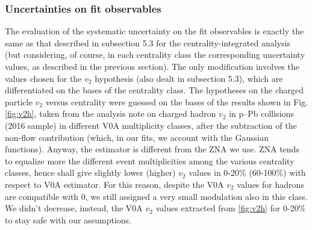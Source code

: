 \subsubsection{Uncertainties on fit observables}
The evaluation of the systematic uncertainty on the fit observables is exactly the same as that described in subsection 5.3 for the centrality-integrated analysis (but considering, of course, in each centrality class the corresponding uncertainty values, as described in the previous section).
The only modification involves the values chosen for the $v_2$ hypothesis (also dealt in subsection 5.3), which are differentiated on the bases of the centrality class.
The hypotheses on the charged particle $v_2$ versus centrality were guessed on the bases of the results shown in Fig. \ref{fig:v2h}, taken from the analysis note on charged hadron $v_2$ in p--Pb collisions (2016 sample) in different V0A multiplicity classes, after the subtraction of the non-flow contribution (which, in our fits, we account with the Gaussian functions). Anyway, the estimator is different from the ZNA we use. ZNA tends to equalize more the different event multiplicities among the various centrality classes, hence shall give slightly lower (higher) $v_2$ values in 0-20\% (60-100\%) with respect to V0A estimator. For this reason, despite the V0A $v_2$ values for hadrons are compatible with 0, we still assigned a very small modulation also in this class. We didn't decrease, instead, the V0A $v_2$ values extracted from \ref{fig:v2h} for 0-20\% to stay safe with our assumptions.

